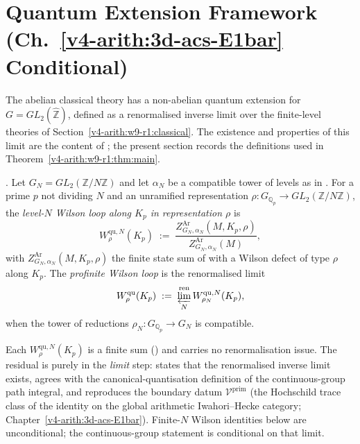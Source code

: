 \section{Quantum Extension Framework (Ch.~\ref{v4-arith:3d-acs-E1bar} Conditional)}
\label{v4-arith:w9-r1:quantum}

The abelian classical theory has a non-abelian quantum extension for
\(G = GL_{2}(\widehat{\mathbb Z})\), defined as a renormalised inverse
limit over the finite-level theories of Section~\ref{v4-arith:w9-r1:classical}.
The existence and properties of this limit are the content of
; the present section records the
definitions used in Theorem~\ref{v4-arith:w9-r1:thm:main}.

\begin{definition}
\label{v4-arith:w9-r1:def:quantum-wilson}
\ClaimStatusDefinitional. Let
\(G_{N}=GL_{2}(\mathbb Z/N\mathbb Z)\) and let \(\alpha_{N}\) be a
compatible tower of levels as in
. For a prime \(p\) not dividing \(N\)
and an unramified representation
\(\rho\colon G_{\mathbb Q_{p}}\to GL_{2}(\mathbb Z/N\mathbb Z)\), the
\emph{level-\(N\) Wilson loop along \(K_{p}\) in representation \(\rho\)} is
\begin{equation}
\label{v4-arith:w9-r1:eq:qu-wilson-N}
W^{\mathrm{qu},N}_{\rho}(K_{p})
\;:=\;\frac{Z^{\mathrm{Ar}}_{G_{N},\alpha_{N}}(M,K_{p},\rho)}{Z^{\mathrm{Ar}}_{G_{N},\alpha_{N}}(M)},
\end{equation}
with \(Z^{\mathrm{Ar}}_{G_{N},\alpha_{N}}(M,K_{p},\rho)\) the finite
state sum of  with a Wilson
defect of type \(\rho\) along \(K_{p}\).
The \emph{profinite Wilson loop} is the
renormalised limit
\begin{equation}
\label{v4-arith:w9-r1:eq:qu-wilson-limit}
W^{\mathrm{qu}}_{\rho}(K_{p})
\;:=\;
\varprojlim_{N}^{\mathrm{ren}} W^{\mathrm{qu},N}_{\rho_{N}}(K_{p}),
\end{equation}
when the tower of reductions
\(\rho_{N}\colon G_{\mathbb Q_{p}}\to G_{N}\) is compatible.
\end{definition}

\begin{remark}
\label{v4-arith:w9-r1:rem:quantum-form}
Each \(W^{\mathrm{qu},N}_{\rho}(K_{p})\) is a finite sum
() and carries no
renormalisation issue. The residual is purely in the \emph{limit}
step:  states that the
renormalised inverse limit exists, agrees with the
canonical-quantisation definition of the continuous-group path
integral, and reproduces the boundary datum \(\mathcal V^{\mathrm{prim}}\)
(the Hochschild trace class of the identity on the global arithmetic
Iwahori--Hecke category; Chapter~\ref{v4-arith:3d-acs-E1bar}). Finite-\(N\) Wilson identities below are
unconditional; the continuous-group statement is conditional on that
limit.
\end{remark}

